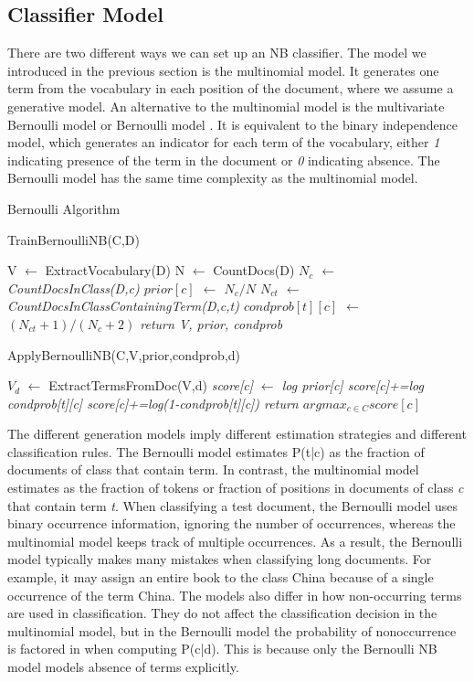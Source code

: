 \documentclass[journal]{IEEEtran}
\begin{document}
\subsection{Classifier Model}
There are two different ways we can set up an NB classifier. The model we introduced in the previous section is the multinomial model. It generates one term from the vocabulary in each position of the document, where we assume a generative model.
An alternative to the multinomial model is the multivariate Bernoulli model or Bernoulli model . It is equivalent to the binary independence model, which generates an indicator for each term of the vocabulary, either \textit{1} indicating presence of the term in the document or \textit{0} indicating absence. The Bernoulli model has the same time complexity as the multinomial model.
{
	\begin{algorithm}[H]
		\caption{Bernoulli Algorithm}
		\label{test}
		TrainBernoulliNB(C,D)
		\begin{algorithmic}[1]
			\STATE V $\leftarrow$ ExtractVocabulary(D) 
			\STATE N $\leftarrow$ CountDocs(D) 
			\STATE\it $N_{c}$ $\leftarrow$ CountDocsInClass(D,c)
			\STATE \it $prior[c]$ $\leftarrow$ $N_{c}/N$
			\STATE \it $N_{ct}$ $\leftarrow$ CountDocsInClassContainingTerm(D,c,t)
			\ENDFOR
			\ENDFOR
			\STATE \it $condprob[t][c]$ $\leftarrow$ $(N_{ct}+1)/(N_{c}+2)$
			\STATE return V, prior, condprob
		\end{algorithmic}		
		
		ApplyBernoulliNB(C,V,prior,condprob,d)
		\begin{algorithmic}[1]
			
			\STATE $V_{d}$ $\leftarrow$ ExtractTermsFromDoc(V,d) 
			\STATE\it score[c] $\leftarrow$ log prior[c]
			\STATE \it score[c]+=log condprob[t][c]
			\ELSE
			\STATE \it score[c]+=log(1-condprob[t][c])
			\ENDIF
			\ENDFOR
			\ENDFOR
			\STATE return $argmax_{c \in C}score[c]$
		\end{algorithmic}
	\end{algorithm}
}
The different generation models imply different estimation strategies and different classification rules.
The Bernoulli model estimates P(t|c) as the fraction of documents of class that contain term. In contrast, the multinomial model estimates as the fraction of tokens or fraction of positions in documents of class \textit{c} that contain term \textit{t}. When classifying a test document, the Bernoulli model uses binary occurrence information, ignoring the number of occurrences, whereas the multinomial model keeps track of multiple occurrences. As a result, the Bernoulli model typically makes many mistakes when classifying long documents. For example, it may assign an entire book to the class China because of a single occurrence of the term China.
The models also differ in how non-occurring terms are used in classification. They do not affect the classification decision in the multinomial model, but in the Bernoulli model the probability of nonoccurrence is factored in when computing P(c|d).
This is because only the Bernoulli NB model models absence of terms explicitly.
\end{document}
